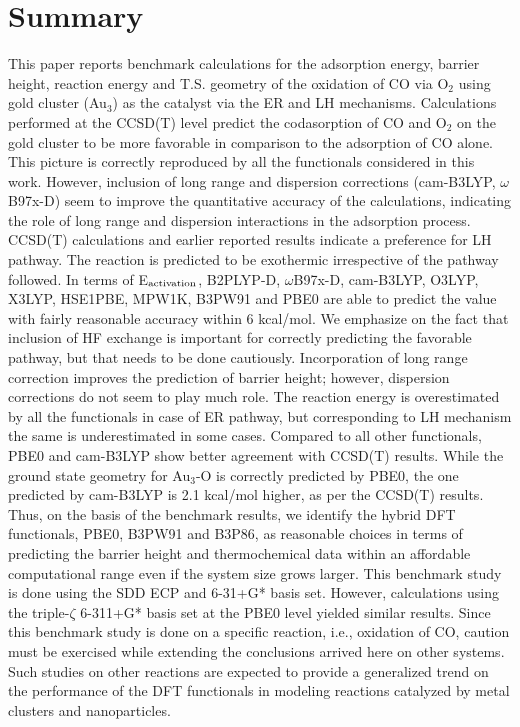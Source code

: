 \section{Summary}
This paper reports benchmark calculations for the adsorption energy, barrier height, reaction energy and T.S. geometry of the oxidation of CO via O$_2$ using gold cluster (Au$_3$) as the catalyst via the ER and LH mechanisms. Calculations performed at the CCSD(T) level predict the codasorption of CO and O$_2$ on the gold cluster to be more favorable in comparison to the adsorption of CO alone. This picture is correctly reproduced by all the functionals considered in this work. However, inclusion of long range and dispersion corrections (cam-B3LYP, $\omega$B97x-D) seem to improve the quantitative accuracy of the calculations, indicating the role of long range and dispersion interactions in the adsorption process. CCSD(T) calculations and earlier reported results indicate a preference for LH pathway. The reaction is predicted to be exothermic irrespective of the pathway followed. In terms of E$_{\rm{activation}}$, B2PLYP-D, $\omega$B97x-D, cam-B3LYP, O3LYP, X3LYP, HSE1PBE, MPW1K, B3PW91 and PBE0 are able to predict the value with fairly reasonable accuracy within 6 kcal/mol. We emphasize on the fact that inclusion of HF exchange is important for correctly predicting the favorable pathway, but that needs to be done cautiously. Incorporation of long range correction improves the prediction of barrier height; however, dispersion corrections do not seem to play much role. The reaction energy is overestimated by all the functionals in case of ER pathway, but corresponding to LH mechanism the same is underestimated in some cases. Compared to all other functionals, PBE0 and cam-B3LYP show better agreement with CCSD(T) results. While the ground state geometry for Au$_3$-O is correctly predicted by PBE0, the one predicted by cam-B3LYP is 2.1 kcal/mol higher, as per the CCSD(T) results. Thus, on the basis of the benchmark results, we identify the hybrid DFT functionals, PBE0, B3PW91 and B3P86, as reasonable choices in terms of predicting the barrier height and thermochemical data within an affordable computational range even if the system size grows larger. This benchmark study is done using the SDD ECP and 6-31+G* basis set. However, calculations using the triple-$\zeta$ 6-311+G* basis set at the PBE0 level yielded similar results. Since this benchmark study is done on a specific reaction, i.e., oxidation of CO, caution must be exercised while extending the conclusions arrived here on other systems. Such studies on other reactions are expected to provide a generalized trend on the performance of the DFT functionals in modeling reactions catalyzed by metal clusters and nanoparticles.

